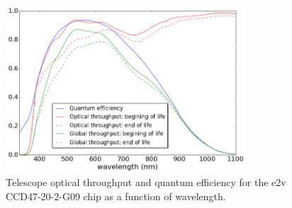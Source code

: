 \documentclass[11pt]{article}      %
\begin{document}
\begin{figure}[htbp]
  \begin{center}
    \includegraphics[width=0.8\textwidth]{throughput_qe_may2020.png}
    \caption{Telescope optical throughput and quantum efficiency for the e2v CCD47-20-2-G09 chip as a function of wavelength.}
    \label{fig:throughput_qe}
  \end{center}
\end{figure}


\end{document}
